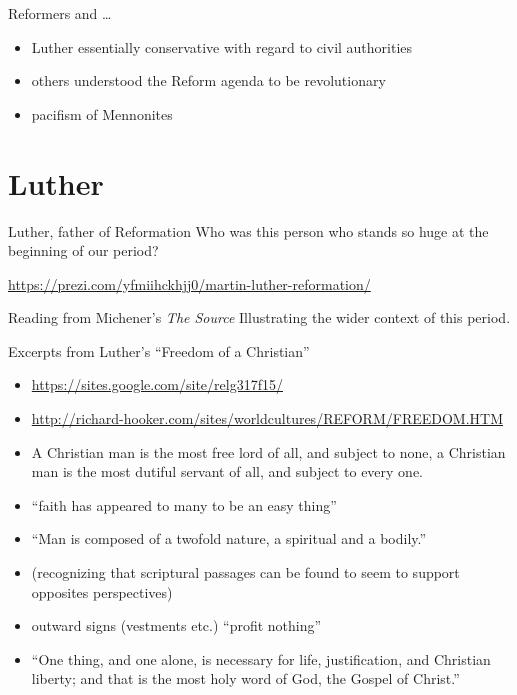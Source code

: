\begin{frame}[label=sec-1-10]{Reformers and \ldots{}}
\begin{itemize}
\item Luther essentially conservative with regard to civil authorities
\item others understood the Reform agenda to be revolutionary
\item pacifism of Mennonites
\end{itemize}
\end{frame}

\section{Luther}
\label{sec-2}
\begin{frame}[label=sec-2-1]{Luther, father of Reformation}
Who was this person who stands so huge at the beginning of our period?

\url{https://prezi.com/yfmiihckhjj0/martin-luther-reformation/}
\end{frame}
\begin{frame}[label=sec-2-2]{Reading from Michener's \emph{The Source}}
Illustrating the wider context of this period.
\end{frame}

\begin{frame}[label=sec-2-3]{Excerpts from Luther's ``Freedom of a Christian''}
\begin{itemize}
\item \url{https://sites.google.com/site/relg317f15/}

\item \url{http://richard-hooker.com/sites/worldcultures/REFORM/FREEDOM.HTM}
\end{itemize}
\end{frame}

\begin{frame}[label=sec-2-4]{}
\begin{itemize}
\item A Christian man is the most free lord of all, and subject to none, a Christian man is the most dutiful servant of all, and subject to every one.
\item ``faith has appeared to many to be an easy thing''
\item ``Man is composed of a twofold nature, a spiritual and a bodily.''
\item (recognizing that scriptural passages can be found to seem to support opposites perspectives)
\item outward signs (vestments etc.) ``profit nothing''
\item ``One thing, and one alone, is necessary for life, justification, and Christian liberty; and that is the most holy word of God, the Gospel of Christ.''
\end{itemize}
\end{frame}

